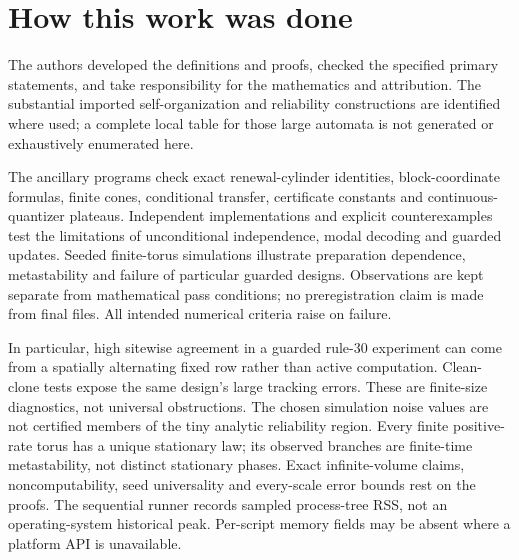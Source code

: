 \section*{How this work was done}
The authors developed the definitions and proofs, checked the
specified primary statements, and take responsibility for the
mathematics and attribution. The substantial imported
self-organization and reliability constructions are identified
where used; a complete local table for those large automata is
not generated or exhaustively enumerated here.

The ancillary programs check exact renewal-cylinder identities,
block-coordinate formulas, finite cones, conditional transfer,
certificate constants and continuous-quantizer plateaus.
Independent implementations and explicit counterexamples test
the limitations of unconditional independence, modal decoding
and guarded updates. Seeded finite-torus simulations illustrate
preparation dependence, metastability and failure of particular
guarded designs. Observations are kept separate from mathematical
pass conditions; no preregistration claim is made from final files.
All intended numerical criteria raise on failure.

In particular, high sitewise agreement in a guarded rule-30
experiment can come from a spatially alternating fixed row rather
than active computation. Clean-clone tests expose the same design's
large tracking errors. These are finite-size diagnostics, not
universal obstructions. The chosen simulation noise values are
not certified members of the tiny analytic reliability region.
Every finite positive-rate torus has a unique stationary law;
its observed branches are finite-time metastability, not distinct
stationary phases. Exact infinite-volume claims, noncomputability,
seed universality and every-scale error bounds rest on the proofs.
The sequential runner records sampled process-tree RSS, not an
operating-system historical peak. Per-script memory fields may
be absent where a platform API is unavailable.

